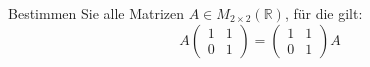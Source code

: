 Bestimmen Sie alle Matrizen \( A \in M_{2 \times 2}(\mathbb{R}) \), für die gilt:
\[
A \begin{pmatrix}
1 & 1 \\
0 & 1
\end{pmatrix}
=
\begin{pmatrix}
1 & 1 \\
0 & 1
\end{pmatrix}
A
\]